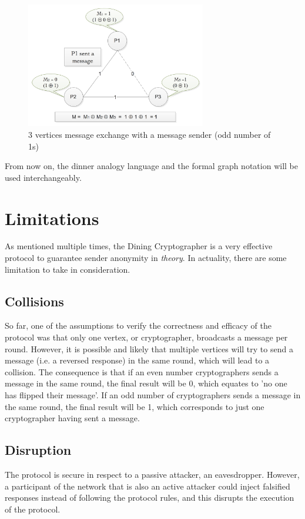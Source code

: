 \begin{figure}[h!]
    \centering
    \includegraphics[width=0.70\textwidth]{Images/DCFormalWithMessage.png}
    \caption{3 vertices message exchange with a message sender (odd number of 1s)}
    \label{fig:dcFormalWithMessage}
\end{figure}

From now on, the dinner analogy language and the formal graph notation will be used interchangeably. \newline \newline \newline

\section{Limitations}
As mentioned multiple times, the Dining Cryptographer is a very effective protocol to guarantee sender anonymity in \textit{theory}. In actuality, there are some limitation to take in consideration.

\subsection{Collisions}
So far, one of the assumptions to verify the correctness and efficacy of the protocol was that only one vertex, or cryptographer, broadcasts a message per round. However, it is possible and likely that multiple vertices will try to send a message (i.e. a reversed response) in the same round, which will lead to a collision. The consequence is that if an even number cryptographers sends a message in the same round, the final result will be 0, which equates to 'no one has flipped their message'. If an odd number of cryptographers sends a message in the same round, the final result will be 1, which corresponds to just one cryptographer having sent a message.

\subsection{Disruption} \label{sec:disruptionlimitation}
The protocol is secure in respect to a passive attacker, an eavesdropper. However, a participant of the network that is also an active attacker could inject falsified responses instead of following the protocol rules, and this disrupts the execution of the protocol. 

